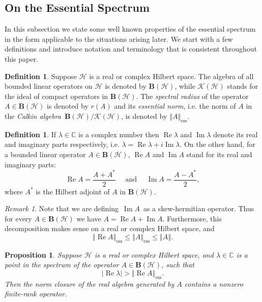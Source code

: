 \documentclass{tran-l}
\newtheorem{prop}[thm]{Proposition}
\theoremstyle{definition}
\newtheorem{defn}[thm]{Definition}
\theoremstyle{remark}
\newtheorem{rem}[thm]{Remark}
\numberwithin{equation}{subsection}
\DeclareMathOperator{\RE}{Re}
\DeclareMathOperator{\IM}{Im}
\DeclareMathOperator{\ess}{ess}
\newcommand{\h}{\mathcal{H}}
\newcommand{\BH}{\mathbf{B}(\mathcal{H})}
\newcommand{\KH}{\mathcal{K}(\mathcal{H})}
\newcommand{\Complex}{\mathbb{C}}
\newcommand{\abs}[1]{\left\vert#1\right\vert}
\newcommand{\norm}[1]{\left\Vert#1\right\Vert}
\newcommand{\essnorm}[1]{\norm{#1}_{\ess}}
\begin{document}
\subsection{On the Essential Spectrum}
In this subsection we state some well known properties of the essential spectrum in the form applicable to the situations arising later. We start with a few definitions and introduce notation and terminology that is consistent throughout this paper.

\begin{defn}
Suppose $\h$ is a real or complex Hilbert space. The algebra of all bounded linear operators on $\h$ is denoted by $\BH$, while $\KH$ stands for the ideal of compact operators in $\BH$. The \emph{spectral radius} of the operator $A\in\BH$ is denoted by $r(A)$ and its \emph{essential norm}, i.e. the norm of $A$ in the \emph{Calkin algebra}\, $\BH/\KH$, is denoted by $\essnorm{A}$.
\end{defn}

\begin{defn}
If $\lambda\in\Complex$ is a complex number then $\RE\lambda$ and $\IM\lambda$ denote its real and imaginary parts respectively, i.e. $\lambda=\RE\lambda+i\IM\lambda$. On the other hand, for a bounded linear operator $A\in\BH$, $\RE{A}$ and $\IM{A}$ stand for its real and imaginary parts:
\[ \RE{A}=\frac{A+A^*}{2} \quad \text{ and } \quad
   \IM{A}=\frac{A-A^*}{2}, \]
where $A^*$ is the Hilbert adjoint of $A$ in $\BH$.
\end{defn}

\begin{rem}
Note that we are defining $\,\IM{A}\,$ as a skew-hermitian operator. Thus for every $A\in\BH$ we have $A=\RE{A}+\IM{A}$. Furthermore, this decomposition makes sense on a real or complex Hilbert space, and
\begin{equation}\label{e:EssIE}
  \essnorm{\RE{A}} \leq \essnorm{A} \leq \norm{A}.
\end{equation}
\end{rem}

\begin{prop}\label{p:ESSPECT}
Suppose $\h$ is a real or complex Hilbert space, and $\lambda\in\Complex$ is a point in the spectrum of the operator $A\in\BH$, such that
\begin{equation} \label{e:ESSINEQ}
  \abs{\RE\lambda} > \essnorm{\RE{A}}.
\end{equation}
Then the norm closure of the real algebra generated by $A$ contains a nonzero finite-rank operator.
\end{prop}
\end{document}
